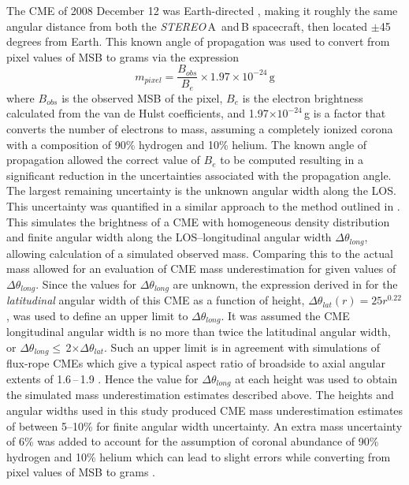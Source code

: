 The CME of 2008 December 12 was Earth-directed \citep{byr10}, making it roughly the same angular distance from both the \emph{STEREO}\,A
\,and\,B spacecraft, then located $\pm$45 degrees from Earth. This known angle of propagation was used to convert from pixel values of MSB to 
grams via the expression
\begin{equation}
m_{pixel}=\frac{B_{obs}}{B_{e}}\times1.97\times10^{-24}\,\mathrm{g}
\end{equation}
where $B_{obs}$ is the observed MSB of the pixel, $B_{e}$ is the electron brightness calculated from the van de Hulst coefficients, and 1.97$
\times10^{-24}$\,g is a factor that converts the number of electrons to mass, assuming a completely ionized corona with a composition of 90\% 
hydrogen and 10\% helium. The known angle of propagation allowed the correct value of $B_{e}$ to be computed resulting in a significant 
reduction in the uncertainties associated with the propagation angle. The largest remaining uncertainty is the unknown angular width along 
the LOS. This uncertainty was quantified in a similar approach to the method outlined in \citet{vou00}. This simulates the brightness of a CME with 
homogeneous density distribution and finite angular width along the LOS--longitudinal angular width $\Delta$$\theta_{long}$, allowing calculation 
of a simulated observed mass. Comparing this to the actual mass allowed for an evaluation of CME mass underestimation for given values of $
\Delta$$\theta_{long}$.  Since the values for $\Delta$$\theta_{long}$ are unknown, the expression derived in \citet{byr10} for the \emph{latitudinal} 
angular width of this CME as a function of height, $\Delta$$\theta_{lat}$$(r)=25r^{0.22}$, was used to define an upper limit to $\Delta$$\theta_{long}
$. It was assumed the CME longitudinal angular width is no more than twice the latitudinal angular width, or $\Delta$$\theta_{long}$$\leqslant$\,2$
\times$$\Delta$$\theta_{lat}$. Such an upper limit is in agreement with simulations of flux-rope CMEs which give a typical aspect ratio of broadside 
to axial angular extents of 1.6\,--\,1.9 \citep{krall2006}. Hence the value for $\Delta$$\theta_{long}$ at each height was used to obtain the simulated 
mass underestimation estimates described above. The heights and angular widths used in this study produced CME mass underestimation 
estimates of between 5--10\% for finite angular width uncertainty. An extra mass uncertainty of 6\% was added to account for the assumption of 
coronal abundance of 90\% hydrogen and 10\% helium which can lead to slight errors while converting from pixel values of MSB to grams \citep
{vour2010}. 

